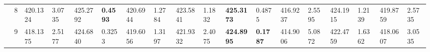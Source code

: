 \documentclass[conference]{IEEEtran}
\begin{document}
\begin{table*}[]
\begin{tabular}{|cc|ll|ll|ll|ll|ll|ll|ll|ll|}
		\multicolumn{1}{|c|}{}                            & 8                               & \multicolumn{1}{l|}{420.1324}          & 3.0735                            & \multicolumn{1}{l|}{425.2792}           & \textbf{0.4593}                   & \multicolumn{1}{l|}{420.6944}          & 1.2784                            & \multicolumn{1}{l|}{423.5841}          & 1.1832                            & \multicolumn{1}{l|}{\textbf{425.3173}}  & 0.4875                            & \multicolumn{1}{l|}{416.9237}          & 2.5595                            & \multicolumn{1}{l|}{424.1915}          & 1.2139                            & \multicolumn{1}{l|}{419.8759}          & 2.5735                            \\ \cline{2-18} 
		\multicolumn{1}{|c|}{}                            & 9                               & \multicolumn{1}{l|}{418.1375}          & 2.5177                            & \multicolumn{1}{l|}{424.6840}           & 0.3253                            & \multicolumn{1}{l|}{419.6056}          & 1.3197                            & \multicolumn{1}{l|}{421.9332}          & 2.4075                            & \multicolumn{1}{l|}{\textbf{424.8995}}  & \textbf{0.1787}                   & \multicolumn{1}{l|}{414.9006}          & 5.0872                            & \multicolumn{1}{l|}{422.4759}          & 1.6362                            & \multicolumn{1}{l|}{418.0607}          & 3.0535                            \\ \hline
	\end{tabular}
\end{table*}
\end{document}
